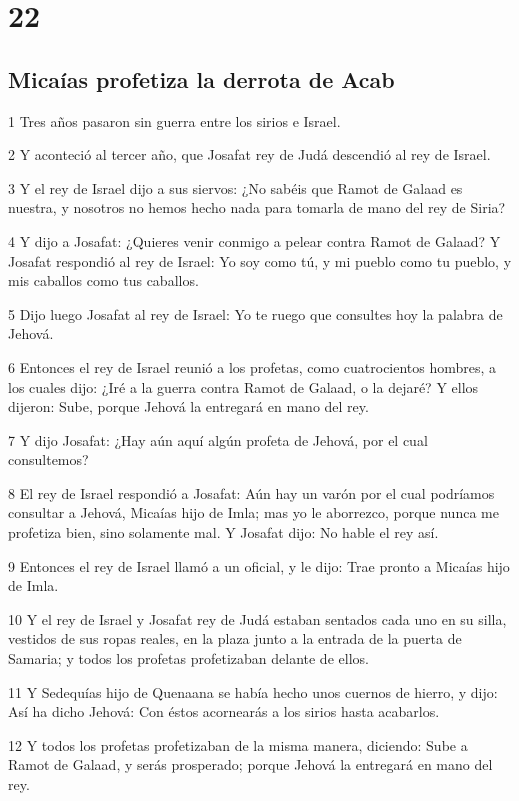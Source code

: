 \chapter{22}

\section*{Micaías profetiza la derrota de Acab}

\par 1 Tres años pasaron sin guerra entre los sirios e Israel.
\par 2 Y aconteció al tercer año, que Josafat rey de Judá descendió al rey de Israel.
\par 3 Y el rey de Israel dijo a sus siervos: ¿No sabéis que Ramot de Galaad es nuestra, y nosotros no hemos hecho nada para tomarla de mano del rey de Siria?
\par 4 Y dijo a Josafat: ¿Quieres venir conmigo a pelear contra Ramot de Galaad? Y Josafat respondió al rey de Israel: Yo soy como tú, y mi pueblo como tu pueblo, y mis caballos como tus caballos.
\par 5 Dijo luego Josafat al rey de Israel: Yo te ruego que consultes hoy la palabra de Jehová.
\par 6 Entonces el rey de Israel reunió a los profetas, como cuatrocientos hombres, a los cuales dijo: ¿Iré a la guerra contra Ramot de Galaad, o la dejaré? Y ellos dijeron: Sube, porque Jehová la entregará en mano del rey.
\par 7 Y dijo Josafat: ¿Hay aún aquí algún profeta de Jehová, por el cual consultemos?
\par 8 El rey de Israel respondió a Josafat: Aún hay un varón por el cual podríamos consultar a Jehová, Micaías hijo de Imla; mas yo le aborrezco, porque nunca me profetiza bien, sino solamente mal. Y Josafat dijo: No hable el rey así.
\par 9 Entonces el rey de Israel llamó a un oficial, y le dijo: Trae pronto a Micaías hijo de Imla.
\par 10 Y el rey de Israel y Josafat rey de Judá estaban sentados cada uno en su silla, vestidos de sus ropas reales, en la plaza junto a la entrada de la puerta de Samaria; y todos los profetas profetizaban delante de ellos.
\par 11 Y Sedequías hijo de Quenaana se había hecho unos cuernos de hierro, y dijo: Así ha dicho Jehová: Con éstos acornearás a los sirios hasta acabarlos.
\par 12 Y todos los profetas profetizaban de la misma manera, diciendo: Sube a Ramot de Galaad, y serás prosperado; porque Jehová la entregará en mano del rey.
